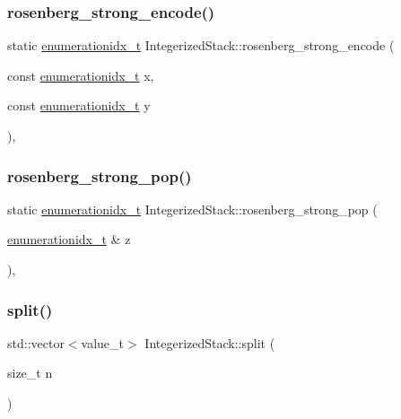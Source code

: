 \subsubsection{\texorpdfstring{rosenberg\+\_\+strong\+\_\+encode()}{rosenberg\_strong\_encode()}}
{\footnotesize\ttfamily static \hyperlink{_integerized_stack_8h_a9fe2bbca873b046b2bd276fc6856bb88}{enumerationidx\+\_\+t} Integerized\+Stack\+::rosenberg\+\_\+strong\+\_\+encode (\begin{DoxyParamCaption}\item[{const \hyperlink{_integerized_stack_8h_a9fe2bbca873b046b2bd276fc6856bb88}{enumerationidx\+\_\+t}}]{x,  }\item[{const \hyperlink{_integerized_stack_8h_a9fe2bbca873b046b2bd276fc6856bb88}{enumerationidx\+\_\+t}}]{y }\end{DoxyParamCaption})\hspace{0.3cm}{\ttfamily [inline]}, {\ttfamily [static]}}

\mbox{\label{class_integerized_stack_afd7b3e942bcde5b794ec06cbbb6593c7}} 
\subsubsection{\texorpdfstring{rosenberg\+\_\+strong\+\_\+pop()}{rosenberg\_strong\_pop()}}
{\footnotesize\ttfamily static \hyperlink{_integerized_stack_8h_a9fe2bbca873b046b2bd276fc6856bb88}{enumerationidx\+\_\+t} Integerized\+Stack\+::rosenberg\+\_\+strong\+\_\+pop (\begin{DoxyParamCaption}\item[{\hyperlink{_integerized_stack_8h_a9fe2bbca873b046b2bd276fc6856bb88}{enumerationidx\+\_\+t} \&}]{z }\end{DoxyParamCaption})\hspace{0.3cm}{\ttfamily [inline]}, {\ttfamily [static]}}

\mbox{\label{class_integerized_stack_a683c0c4d78ebea10a822aeaaaef5349e}} 
\subsubsection{\texorpdfstring{split()}{split()}}
{\footnotesize\ttfamily std\+::vector$<$value\+\_\+t$>$ Integerized\+Stack\+::split (\begin{DoxyParamCaption}\item[{size\+\_\+t}]{n }\end{DoxyParamCaption})\hspace{0.3cm}{\ttfamily [inline]}}



